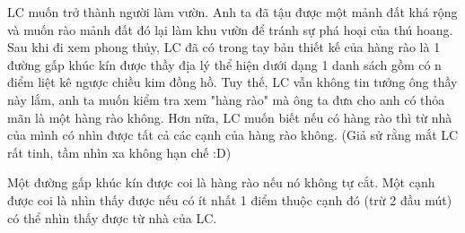 LC muốn trở thành người làm vườn. Anh ta đã tậu được một mảnh đất khá rộng và muốn rào mảnh đất đó lại làm khu vườn để tránh sự phá hoại của thú hoang. Sau khi đi xem phong thủy, LC đã có trong tay bản thiết kế của hàng rào là 1 đường gấp khúc kín được thầy địa lý thể hiện dưới dạng 1 danh sách gồm có n điểm liệt kê ngược chiều kim đồng hồ. Tuy thế, LC vẫn không tin tưởng ông thầy này lắm, anh ta muốn kiểm tra xem "hàng rào" mà ông ta đưa cho anh có thỏa mãn là một hàng rào không. Hơn nữa, LC muốn biết nếu có hàng rào thì từ nhà của mình có nhìn được tất cả các cạnh của hàng rào không. (Giả sử rằng mắt LC rất tinh, tầm nhìn xa không hạn chế :D)  

Một đường gấp khúc kín được coi là hàng rào nếu nó không tự cắt. Một cạnh được coi là nhìn thấy được nếu có ít nhất 1 điểm thuộc cạnh đó (trừ 2 đầu mút) có thể nhìn thấy được từ nhà của LC.
